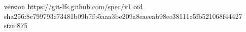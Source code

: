version https://git-lfs.github.com/spec/v1
oid sha256:8c799793e73481b09b7fb5aaa3be209a8eaeeab98ee38111e5fb521068f44427
size 875
